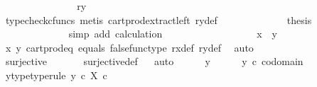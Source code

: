 \begin{isabellebody}
\ \ \ \ \ \ \ \ \ \ \isamarkupfalse%
\ \isamarkupfalse%
\ {\isachardoublequoteopen}{\isachardot}{\kern0pt}{\isachardot}{\kern0pt}{\isachardot}{\kern0pt}\ {\isacharequal}{\kern0pt}\ {\isasymlangle}ry{\isacharcomma}{\kern0pt}\ {\isasymf}{\isasymrangle}{\isachardoublequoteclose}\isanewline
\ \ \ \ \ \ \ \ \ \ \ \ \isamarkupfalse%
\ {\isacharparenleft}{\kern0pt}typecheck{\isacharunderscore}{\kern0pt}cfuncs{\isacharcomma}{\kern0pt}\ metis\ cart{\isacharunderscore}{\kern0pt}prod{\isacharunderscore}{\kern0pt}extract{\isacharunderscore}{\kern0pt}left\ ry{\isacharunderscore}{\kern0pt}def{\isacharparenright}{\kern0pt}\isanewline
\ \ \ \ \ \ \ \ \ \ \isamarkupfalse%
\ \isamarkupfalse%
\ {\isacharquery}{\kern0pt}thesis\isanewline
\ \ \ \ \ \ \ \ \ \ \ \ \isamarkupfalse%
\ {\isacharparenleft}{\kern0pt}simp\ add{\isacharcolon}{\kern0pt}\ calculation{\isacharparenright}{\kern0pt}\isanewline
\ \ \ \ \ \ \ \ \isamarkupfalse%
\isanewline
\ \ \ \ \ \ \ \ \isamarkupfalse%
\ {\isachardoublequoteopen}x\ {\isacharequal}{\kern0pt}\ y{\isachardoublequoteclose}\isanewline
\ \ \ \ \ \ \ \ \ \ \isamarkupfalse%
\ {\isasymrho}x\ {\isasymrho}y\ cart{\isacharunderscore}{\kern0pt}prod{\isacharunderscore}{\kern0pt}eq{}\ equals\ false{\isacharunderscore}{\kern0pt}func{\isacharunderscore}{\kern0pt}type\ rx{\isacharunderscore}{\kern0pt}def\ ry{\isacharunderscore}{\kern0pt}def\ \isamarkupfalse%
\ auto\isanewline
\ \ \ \ \ \ \isamarkupfalse%
\isanewline
\ \ \ \ \isamarkupfalse%
\isanewline
\ \ \isamarkupfalse%
\isanewline
\ \ \isamarkupfalse%
\ {\isachardoublequoteopen}surjective\ {\isasymrho}{\isachardoublequoteclose}\isanewline
\ \ \ \ \isamarkupfalse%
\ surjective{\isacharunderscore}{\kern0pt}def\isanewline
\ \ \isamarkupfalse%
{\isacharparenleft}{\kern0pt}auto{\isacharparenright}{\kern0pt}\isanewline
\ \ \ \ \isamarkupfalse%
\ y\isanewline
\ \ \ \ \isamarkupfalse%
\ {\isachardoublequoteopen}y\ {\isasymin}\isactrlsub c\ codomain\ {\isasymrho}{\isachardoublequoteclose}\ \isamarkupfalse%
\ \isamarkupfalse%
\ y{\isacharunderscore}{\kern0pt}type{\isacharbrackleft}{\kern0pt}type{\isacharunderscore}{\kern0pt}rule{\isacharbrackright}{\kern0pt}{\isacharcolon}{\kern0pt}\ {\isachardoublequoteopen}y\ {\isasymin}\isactrlsub c\ X\ {\isasymtimes}\isactrlsub c\ {\isasymOmega}{\isachardoublequoteclose}\isanewline

\end{isabellebody}
